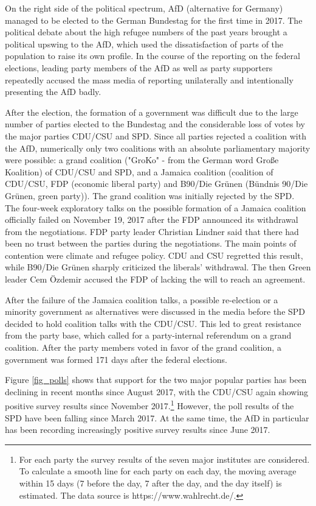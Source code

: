 \documentclass[12pt,a4paper,notitlepage]{article}
\begin{document}
On the right side of the political spectrum, AfD (alternative for Germany) managed to be elected to the German Bundestag for the first time in 2017. The political debate about the high refugee numbers of the past years brought a political upswing to the AfD, which used the dissatisfaction of parts of the population to raise its own profile. In the course of the reporting on the federal elections, leading party members of the AfD as well as party supporters repeatedly accused the mass media of reporting unilaterally and intentionally presenting the AfD badly.

After the election, the formation of a government was difficult due to the large number of parties elected to the Bundestag and the considerable loss of votes by the major parties CDU/CSU and SPD. Since all parties rejected a coalition with the AfD, numerically only two coalitions with an absolute parliamentary majority were possible: a grand coalition ("GroKo" - from the German word Große Koalition) of CDU/CSU and SPD, and a Jamaica coalition (coalition of CDU/CSU, FDP (economic liberal party) and B90/Die Grünen (Bündnis 90/Die Grünen, green party)). The grand coalition was initially rejected by the SPD. The four-week exploratory talks on the possible formation of a Jamaica coalition officially failed on November 19, 2017 after the FDP announced its withdrawal from the negotiations. FDP party leader Christian Lindner said that there had been no trust between the parties during the negotiations. The main points of contention were climate and refugee policy. CDU and CSU regretted this result, while B90/Die Grünen sharply criticized the liberals' withdrawal. The then Green leader Cem Özdemir accused the FDP of lacking the will to reach an agreement.

After the failure of the Jamaica coalition talks, a possible re-election or a minority government as alternatives were discussed in the media before the SPD decided to hold coalition talks with the CDU/CSU. This led to great resistance from the party base, which called for a party-internal referendum on a grand coalition. After the party members voted in favor of the grand coalition, a government was formed 171 days after the federal elections. 

Figure \ref{fig_polls} shows that support for the two major popular parties has been declining in recent months since August 2017, with the CDU/CSU again showing positive survey results since November 2017.\footnote{For each party the survey results of the seven major institutes are considered. To calculate a smooth line for each party on each day, the moving average within 15 days (7 before the day, 7 after the day, and the day itself) is estimated. The data source is https://www.wahlrecht.de/.} However, the poll results of the SPD have been falling since March 2017. At the same time, the AfD in particular has been recording increasingly positive survey results since June 2017.  
\end{document}
